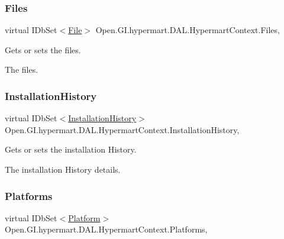 \subsubsection{\texorpdfstring{Files}{Files}}
{\footnotesize\ttfamily virtual I\+Db\+Set$<$\hyperlink{class_open_1_1_g_i_1_1hypermart_1_1_models_1_1_file}{File}$>$ Open.\+G\+I.\+hypermart.\+D\+A\+L.\+Hypermart\+Context.\+Files\hspace{0.3cm}{\ttfamily [get]}, {\ttfamily [set]}}



Gets or sets the files. 

The files. \hypertarget{class_open_1_1_g_i_1_1hypermart_1_1_d_a_l_1_1_hypermart_context_a0ea04cdf64676cc94cc0e910f9c2fe5f}{}\label{class_open_1_1_g_i_1_1hypermart_1_1_d_a_l_1_1_hypermart_context_a0ea04cdf64676cc94cc0e910f9c2fe5f} 
\subsubsection{\texorpdfstring{Installation\+History}{InstallationHistory}}
{\footnotesize\ttfamily virtual I\+Db\+Set$<$\hyperlink{class_open_1_1_g_i_1_1hypermart_1_1_models_1_1_installation_history}{Installation\+History}$>$ Open.\+G\+I.\+hypermart.\+D\+A\+L.\+Hypermart\+Context.\+Installation\+History\hspace{0.3cm}{\ttfamily [get]}, {\ttfamily [set]}}



Gets or sets the installation History. 

The installation History details. \hypertarget{class_open_1_1_g_i_1_1hypermart_1_1_d_a_l_1_1_hypermart_context_af3f2a4e0cc12b56ba4b87e6de7e0d9b8}{}\label{class_open_1_1_g_i_1_1hypermart_1_1_d_a_l_1_1_hypermart_context_af3f2a4e0cc12b56ba4b87e6de7e0d9b8} 
\subsubsection{\texorpdfstring{Platforms}{Platforms}}
{\footnotesize\ttfamily virtual I\+Db\+Set$<$\hyperlink{class_open_1_1_g_i_1_1hypermart_1_1_models_1_1_platform}{Platform}$>$ Open.\+G\+I.\+hypermart.\+D\+A\+L.\+Hypermart\+Context.\+Platforms\hspace{0.3cm}{\ttfamily [get]}, {\ttfamily [set]}}



